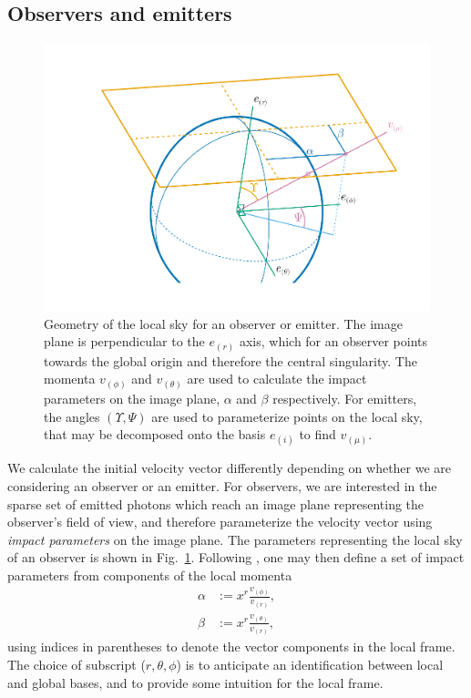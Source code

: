 \documentclass[fleqn,usenatbib]{mnras}
\begin{document}
\subsection{Observers and emitters}

\begin{figure}
    \centering
    \includegraphics[width=0.99\linewidth]{figures/skycoords.pdf}
    \caption{
    Geometry of the local sky for an observer or emitter. The image plane is
    perpendicular to the $e_{(r)}$ axis, which for an observer points towards
    the global origin and therefore the central singularity. The momenta
    $v_{(\phi)}$ and $v_{(\theta)}$ are used to calculate the impact parameters
    on the image plane, $\alpha$ and $\beta$ respectively. For emitters, the
    angles $(\Upsilon, \Psi)$ are used to parameterize points on the local sky,
    that may be decomposed onto the basis $e_{(i)}$ to find $v_{(\mu)}$.
    }
    \label{fig:observer-coordinates}
\end{figure}

We calculate the initial velocity vector differently depending on whether we are
considering an observer or an emitter. For observers, we are interested in the
sparse set of emitted photons which reach an image plane representing the
observer's field of view, and therefore parameterize the velocity vector using
\emph{impact parameters} on the image plane. The parameters representing the
local sky of an observer is shown in Fig.~\ref{fig:observer-coordinates}.
Following \cite{cunningham_optical_1973}, one may then define a set of impact
parameters from components of the local momenta
\begin{align}
    \alpha &:=  x^r \frac{v_{(\phi)}}{v_{(r)}}, \\
    \beta &:= x^r \frac{v_{(\theta)}}{v_{(r)}},
\end{align}
using indices in parentheses to denote the vector components in the local
frame. The choice of subscript ($r, \theta, \phi$) is to anticipate an
identification between local and global bases, and to provide some intuition
for the local frame.
\end{document}
